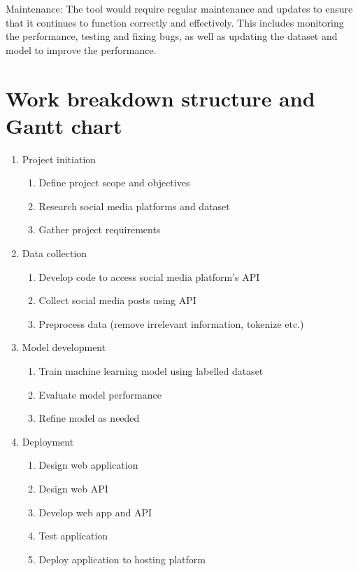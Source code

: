 \documentclass[a4paper,12pt]{article}
\begin{document}
Maintenance: The tool would require regular maintenance and updates to ensure that it continues to function correctly and effectively. This includes monitoring the performance, testing and fixing bugs, as well as updating the dataset and model to improve the performance.


 \section{Work breakdown structure and Gantt chart}

 \begin{enumerate}
     \item Project initiation
     \begin{enumerate}
         \item Define project scope and objectives
         \item Research social media platforms and dataset
         \item Gather project requirements
     \end{enumerate}
     \item  Data collection
     \begin{enumerate}
         \item Develop code to access social media platform's API
         \item Collect social media posts using API
         \item Preprocess data (remove irrelevant information, tokenize etc.)
     \end{enumerate}
     \item Model development
     \begin{enumerate}
         \item Train machine learning model using labelled dataset
         \item Evaluate model performance
         \item Refine model as needed
     \end{enumerate}
     \item Deployment
     \begin{enumerate}
         \item Design web application
         \item Design web API 
         \item Develop web app and API
         \item Test application
         \item Deploy application to hosting platform
     \end{enumerate}

\end{enumerate}
\end{document}
